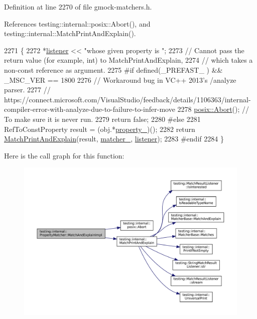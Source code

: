 Definition at line 2270 of file gmock-\/matchers.\+h.



References testing\+::internal\+::posix\+::\+Abort(), and testing\+::internal\+::\+Match\+Print\+And\+Explain().


\begin{DoxyCode}
2271                                                                 \{
2272     *\hyperlink{namespaceinteractive__marker_a0e579ab555212bb5e2c9f8a675b7618a}{listener} << \textcolor{stringliteral}{"whose given property is "};
2273     \textcolor{comment}{// Cannot pass the return value (for example, int) to MatchPrintAndExplain,}
2274     \textcolor{comment}{// which takes a non-const reference as argument.}
2275 \textcolor{preprocessor}{#if defined(\_PREFAST\_ ) && \_MSC\_VER == 1800}
2276     \textcolor{comment}{// Workaround bug in VC++ 2013's /analyze parser.}
2277     \textcolor{comment}{//
       https://connect.microsoft.com/VisualStudio/feedback/details/1106363/internal-compiler-error-with-analyze-due-to-failure-to-infer-move}
2278     \hyperlink{namespacetesting_1_1internal_1_1posix_a69b8278c59359dd6a6f941b4643db9fb}{posix::Abort}();  \textcolor{comment}{// To make sure it is never run.}
2279     \textcolor{keywordflow}{return} \textcolor{keyword}{false};
2280 \textcolor{preprocessor}{#else}
2281     RefToConstProperty result = (obj.*\hyperlink{classtesting_1_1internal_1_1PropertyMatcher_a3c7a303b73d6130ba775932a7c26b92d}{property\_})();
2282     \textcolor{keywordflow}{return} \hyperlink{namespacetesting_1_1internal_a0821df2611d54c79bac990719ad8a2dd}{MatchPrintAndExplain}(result, \hyperlink{classtesting_1_1internal_1_1PropertyMatcher_af7733557fde1558190ab9c63d23f1305}{matcher\_}, 
      \hyperlink{namespaceinteractive__marker_a0e579ab555212bb5e2c9f8a675b7618a}{listener});
2283 \textcolor{preprocessor}{#endif}
2284   \}
\end{DoxyCode}
Here is the call graph for this function\+:
\nopagebreak
\begin{figure}[H]
\begin{center}
\leavevmode
\includegraphics[width=350pt]{classtesting_1_1internal_1_1PropertyMatcher_aee28dd64a2896159661a4f3ad3329ffd_cgraph}
\end{center}
\end{figure}
